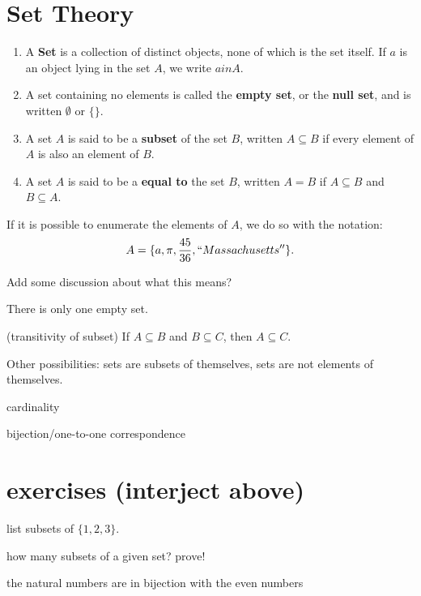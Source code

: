 \section{Set Theory}\label{sec:settheory}

\begin{definition}
\begin{enumerate}
    \item \label{def:set} A \textbf{Set} is a collection of distinct objects, none of which is the set itself.  If $a$ is an object lying in the set $A$, we write $a in A$.
    \item \label{def:nullset} A set containing no elements is called the \textbf{empty set}, or the \textbf{null set}, and is written $\emptyset$ or $\{ \}$.
    \item \label{def:subset} A set $A$ is said to be a \textbf{subset} of the set $B$, written $A \subseteq B$ if every element of $A$ is also an element of $B$.
    \item \label{def:setequality} A set $A$ is said to be a \textbf{equal to} the set $B$, written $A = B$ if $A \subseteq B$ and $B \subseteq A$.
\end{enumerate}
\end{definition}

If it is possible to enumerate the elements of $A$, we do so with the notation:
$$ A = \{ a, \pi, \frac{45}{36}, ``Massachusetts''\}.$$

Add some discussion about what this means?

\begin{theorem}\label{thm:nullsetunique} There is only one empty set.
\end{theorem}

\begin{lemma}\label{lem:subsettransitivity} (transitivity of subset) If $A \subseteq B$ and $B \subseteq C$, then $A \subseteq C$.
\end{lemma}

Other possibilities: sets are subsets of themselves, sets are not elements of themselves.

cardinality

bijection/one-to-one correspondence


\section*{exercises (interject above)}

list subsets of $\{1, 2, 3\}$.

how many subsets of a given set? prove!

the natural numbers are in bijection with the even numbers
